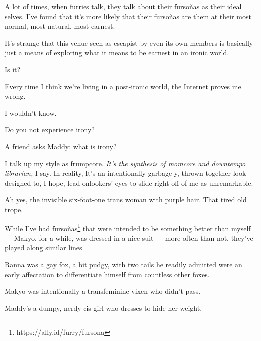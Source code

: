 \label{furry:furry}
\begin{paracol}{2}
  \begin{leftcolumn}

\noindent A lot of times, when furries talk, they talk about their fursoñas as their ideal selves. I've found that it's more likely that their fursoñas are them at their most normal, most natural, most earnest.

It's strange that this venue seen as escapist by even its own members is basically just a means of exploring what it means to be earnest in an ironic world.

\begin{ally}
Is it?
\end{ally}
Every time I think we're living in a post-ironic world, the Internet proves me wrong.

\begin{ally}
I wouldn't know.
\end{ally}
Do you not experience irony?

\begin{ally}
A friend asks Maddy: what is irony?
\end{ally}
\end{leftcolumn}
\begin{rightcolumn*}
  
\end{rightcolumn*}
\begin{leftcolumn}
\newpage

\noindent I talk up my style as frumpcore. \emph{It's the synthesis of momcore and downtempo librarian,} I say. In reality, It's an intentionally garbage-y, thrown-together look designed to, I hope, lead onlookers' eyes to slide right off of me as unremarkable.

\begin{ally}
Ah yes, the invisible six-foot-one trans woman with purple hair. That tired old trope.
\end{ally}
While I've had fursoñas\footnote{https://ally.id/furry/fursona} that were intended to be something better than myself --- Makyo, for a while, was dressed in a nice suit --- more often than not, they've played along similar lines.

Ranna was a gay fox, a bit pudgy, with two tails he readily admitted were an early affectation to differentiate himself from countless other foxes.

Makyo was intentionally a transfeminine vixen who didn't pass.

Maddy's a dumpy, nerdy cis girl who dresses to hide her weight.


\end{leftcolumn}
\end{paracol}
